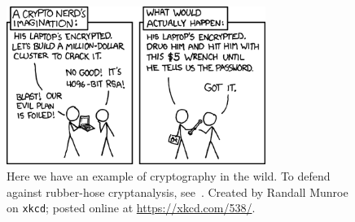 \begin{figure}[t]
\centering
    \includegraphics[width=0.75\textwidth]{figures/xkcd/xkcd_538_security.png}
    \caption[\texttt{xkcd} Security]{Here we have an example of cryptography
        in the wild.
        To defend against rubber-hose cryptanalysis,
        see~\cite{bojinov2012neuroscience}.
        Created by Randall Munroe on \texttt{xkcd};
        posted online at \url{https://xkcd.com/538/}.
        }
    \label{fig:xkcd_security}
\end{figure}
